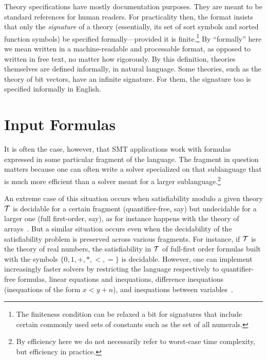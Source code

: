 Theory specifications have mostly documentation purposes.
They are meant to be standard references for human readers.
For practicality then, the format insists that only the \emph{signature} of 
a theory (essentially, its set of sort symbols and sorted function symbols) 
be specified formally---provided it is finite.\footnote{
The finiteness condition can be relaxed a bit for signatures
that include certain commonly used sets of constants such as 
the set of all numerals.
}
By ``formally'' here 
we mean written in a machine-readable and processable format,
as opposed to written in free text, no matter how rigorously.
By this definition, theories themselves are defined informally, 
in natural language.
%
Some theories, such as the theory of bit vectors, have an infinite signature.
For them, the signature too is specified informally in English.

\section{Input Formulas}

It is often the case, however, that 
SMT applications work with formulas expressed in some particular fragment 
of the language.
The fragment in question matters
because one can often write a solver specialized on that sublanguage 
that is much more efficient than a solver meant for a larger sublanguage.\footnote{
By efficiency here we do not necessarily refer to worst-case time complexity,
but efficiency in practice.
}

An extreme case of this situation occurs
when satisfiability modulo a given theory $\mathcal{T}$
is decidable for a certain fragment (quantifier-free, say)
but undecidable for a larger one (full first-order, say),
as for instance happens with the theory of arrays~\cite{BraMS-VMCAI-06}.
But a similar situation occurs even
when the decidability of the satisfiability problem is preserved 
across various fragments.
For instance, 
if $\mathcal{T}$ is the theory of real numbers,
the satisfiability in $\mathcal{T}$ of full-first order formulas
built with the symbols $\{0,1,+,*,<,=\}$ is decidable.
However, one can implement increasingly faster solvers by restricting
the language respectively to quantifier-free formulas, 
linear equations and inequations,
difference inequations (inequations of the form $x < y + n$),
and
inequations between variables~\cite{Bozzanoetal2005TACAS}.

